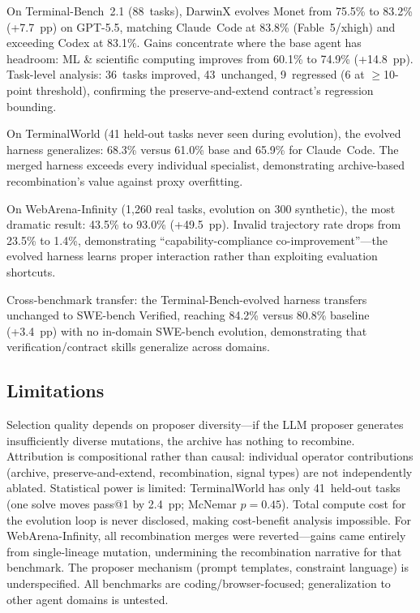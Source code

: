 \documentclass[11pt,a4paper]{article}
\begin{document}
On Terminal-Bench~2.1 (88~tasks), DarwinX evolves Monet from 75.5\% to 83.2\% (+7.7~pp) on GPT-5.5, matching Claude~Code at 83.8\% (Fable~5/xhigh) and exceeding Codex at 83.1\%. Gains concentrate where the base agent has headroom: ML \& scientific computing improves from 60.1\% to 74.9\% (+14.8~pp). Task-level analysis: 36~tasks improved, 43~unchanged, 9~regressed (6 at $\geq$10-point threshold), confirming the preserve-and-extend contract's regression bounding.

On TerminalWorld (41 held-out tasks never seen during evolution), the evolved harness generalizes: 68.3\% versus 61.0\% base and 65.9\% for Claude~Code. The merged harness exceeds every individual specialist, demonstrating archive-based recombination's value against proxy overfitting.

On WebArena-Infinity (1,260 real tasks, evolution on 300 synthetic), the most dramatic result: 43.5\% to 93.0\% (+49.5~pp). Invalid trajectory rate drops from 23.5\% to 1.4\%, demonstrating ``capability-compliance co-improvement''---the evolved harness learns proper interaction rather than exploiting evaluation shortcuts.

Cross-benchmark transfer: the Terminal-Bench-evolved harness transfers unchanged to SWE-bench Verified, reaching 84.2\% versus 80.8\% baseline (+3.4~pp) with no in-domain SWE-bench evolution, demonstrating that verification/contract skills generalize across domains.

\subsection{Limitations}

Selection quality depends on proposer diversity---if the LLM proposer generates insufficiently diverse mutations, the archive has nothing to recombine. Attribution is compositional rather than causal: individual operator contributions (archive, preserve-and-extend, recombination, signal types) are not independently ablated. Statistical power is limited: TerminalWorld has only 41~held-out tasks (one solve moves pass@1 by 2.4~pp; McNemar $p=0.45$). Total compute cost for the evolution loop is never disclosed, making cost-benefit analysis impossible. For WebArena-Infinity, all recombination merges were reverted---gains came entirely from single-lineage mutation, undermining the recombination narrative for that benchmark. The proposer mechanism (prompt templates, constraint language) is underspecified. All benchmarks are coding/browser-focused; generalization to other agent domains is untested.
\end{document}
